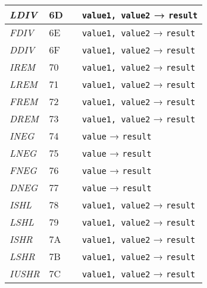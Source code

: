 \begin{center}
\begin{longtable}{ | p{} | p{} | p{} | p{} | }
        \emph{LDIV}
		& 6D & & \lstinline|value1, value2| → \lstinline|result|
		\\ \hline

        \emph{FDIV}
		& 6E & & \lstinline|value1, value2| → \lstinline|result|
		\\ \hline

        \emph{DDIV}
		& 6F & & \lstinline|value1, value2| → \lstinline|result|
		\\ \hline
        
        \emph{IREM}
		& 70 & & \lstinline|value1, value2| → \lstinline|result|
		\\ \hline

        \emph{LREM}
		& 71 & & \lstinline|value1, value2| → \lstinline|result|
		\\ \hline

        \emph{FREM}
		& 72 & & \lstinline|value1, value2| → \lstinline|result|
		\\ \hline

        \emph{DREM}
		& 73 & & \lstinline|value1, value2| → \lstinline|result|
		\\ \hline
        
        \emph{INEG}
		& 74 & & \lstinline|value| → \lstinline|result|
		\\ \hline

        \emph{LNEG}
		& 75 & & \lstinline|value| → \lstinline|result|
		\\ \hline

        \emph{FNEG}
		& 76 & & \lstinline|value| → \lstinline|result|
		\\ \hline

        \emph{DNEG}
		& 77 & & \lstinline|value| → \lstinline|result|
		\\ \hline

        \emph{ISHL}
		& 78 & & \lstinline|value1, value2| → \lstinline|result|
		\\ \hline

        \emph{LSHL}
		& 79 & & \lstinline|value1, value2| → \lstinline|result|
		\\ \hline

        \emph{ISHR}
		& 7A & & \lstinline|value1, value2| → \lstinline|result|
		\\ \hline

        \emph{LSHR}
		& 7B & & \lstinline|value1, value2| → \lstinline|result|
		\\ \hline

        \emph{IUSHR}
		& 7C & & \lstinline|value1, value2| → \lstinline|result|
		\\ \hline


\end{longtable}
\end{center}
